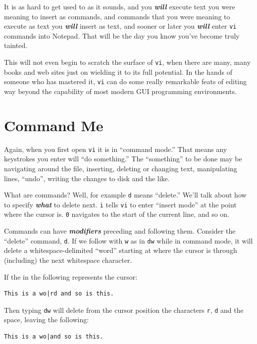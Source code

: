 \documentclass[10pt,]{book}
\numberwithin{figure}{chapter}
\begin{document}
It is as hard to get used to as it sounds, and you \textbf{\emph{will}}
execute text you were meaning to insert as commands, and commands that
you were meaning to execute as text you \textbf{\emph{will}} insert as
text, and sooner or later you \textbf{\emph{will}} enter \texttt{vi}
commands into Notepad. That will be the day you know you've become truly
tainted.

This will not even begin to scratch the surface of \texttt{vi}, when
there are many, many books and web sites just on wielding it to its full
potential. In the hands of someone who has mastered it, \texttt{vi} can
do some really remarkable feats of editing way beyond the capability of
most modern GUI programming environments.

\section{Command Me}\label{command-me}

Again, when you first open \texttt{vi} it is in ``command mode.'' That
means any keystrokes you enter will ``do something.'' The ``something''
to be done may be navigating around the file, inserting, deleting or
changing text, manipulating lines, ``undo'', writing the changes to disk
and the like.

What are commands? Well, for example \texttt{d} means ``delete.'' We'll
talk about how to specify \textbf{\emph{what}} to delete next.
\texttt{i} tells \texttt{vi} to enter ``insert mode'' at the point where
the cursor is. \texttt{0} navigates to the start of the current line,
and so on.

Commands can have \textbf{\emph{modifiers}} preceding and following
them. Consider the ``delete'' command, \texttt{d}. If we follow with
\texttt{w} as in \texttt{dw} while in command mode, it will delete a
whitespace-delimited ``word'' starting at where the cursor is through
(including) the next whitespace character.

If the \texttt{\textbar{}} in the following represents the cursor:

\begin{verbatim}
This is a wo|rd and so is this.
\end{verbatim}

Then typing \texttt{dw} will delete from the cursor position the
characters \texttt{r}, \texttt{d} and the space, leaving the following:

\begin{verbatim}
This is a wo|and so is this.
\end{verbatim}
\end{document}
